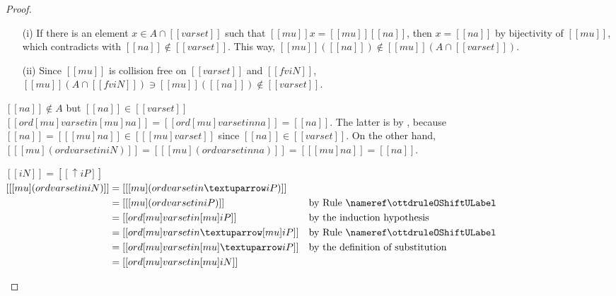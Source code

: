 \begin{proof}
\begin{caseof}
\begin{caseof}
       \begin{enumerate}
       \item[(i)] If there is an element $x \in A \cap [[varset]]$ such that
         $[[mu]] x = [[mu]] [[na]]$, then $x = [[na]]$ by bijectivity of
         $[[mu]]$, which contradicts with $[[na]] \notin [[varset]]$. This way, 
         $[[mu]]([[na]]) \notin [[mu]](A \cap [[varset]])$.
       \item[(ii)]
         Since $[[mu]]$ is collision free on $[[varset]]$ and $[[fv iN]]$,
         $[[mu]] (A \cap [[fv iN]]) \ni [[mu]]([[na]]) \notin [[varset]]$.
       \end{enumerate}

     \item $[[na]] \notin A$ but $[[na]] \in [[varset]]$\\
       $[[ ord [mu] varset in [mu] na ]] = [[ ord [mu] varset in na ]] = [[na]]$.
       The latter is by , because
       $[[na]] = [[ [mu] na ]] \in [[ [mu] varset ]]$ since $[[na]] \in [[varset]]$.
       On the other hand, $[[ [mu] (ord varset in iN) ]] = [[ [mu] (ord varset in na)]] = [[ [mu] na ]] = [[na]]$.
    \end{caseof}
  
  \item $[[iN]] = [[↑iP]]$ \\
    $\begin{aligned}[t]
       [[ [mu] (ord varset in iN) ]] &= [[ [mu] (ord varset in ↑iP) ]] \\
                                     &= [[ [mu] (ord varset in iP) ]]
                                     && \text{by \ruleref{\ottdruleOShiftULabel}}\\
                                     &= [[ ord [mu]varset in [mu]iP ]]
                                     && \text{by the induction hypothesis}\\
                                     &= [[ ord [mu]varset in  ↑[mu]iP ]]
                                     && \text{by \ruleref{\ottdruleOShiftULabel}}\\
                                     &= [[ ord [mu]varset in  [mu]↑iP ]]
                                     && \text{by the definition of substitution}\\
                                     &= [[ ord [mu]varset in  [mu]iN ]]
            \end{aligned}$
          

\end{caseof}
\end{proof}
